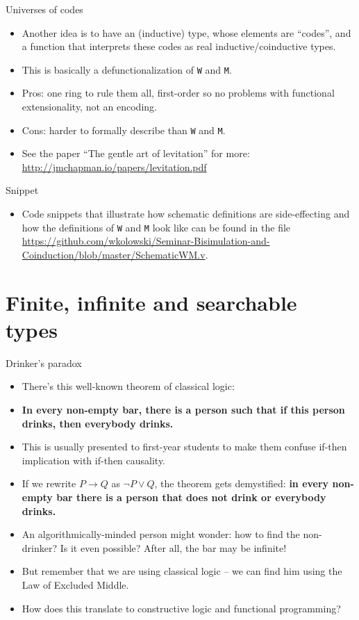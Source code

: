 \documentclass{beamer}
\begin{document}
\begin{frame}{Universes of codes}
\begin{itemize}
	\item Another idea is to have an (inductive) type, whose elements are ``codes'', and a function that interprets these codes as real inductive/coinductive types.
	\item This is basically a defunctionalization of \texttt{W} and \texttt{M}.
	\item Pros: one ring to rule them all, first-order so no problems with functional extensionality, not an encoding.
	\item Cons: harder to formally describe than \texttt{W} and \texttt{M}.
	\item See the paper ``The gentle art of levitation'' for more: \url{http://jmchapman.io/papers/levitation.pdf}
\end{itemize}
\end{frame}

\begin{frame}{Snippet}
\begin{itemize}
	\item Code snippets that illustrate how schematic definitions are side-effecting and how the definitions of \texttt{W} and \texttt{M} look like can be found in the file \url{https://github.com/wkolowski/Seminar-Bisimulation-and-Coinduction/blob/master/SchematicWM.v}.
\end{itemize}
\end{frame}

\section{Finite, infinite and searchable types}

\begin{frame}{Drinker's paradox}
\begin{itemize}
	\item There's this well-known theorem of classical logic:
	\item \textbf{In every non-empty bar, there is a person such that if this person drinks, then everybody drinks.}
	\item This is usually presented to first-year students to make them confuse if-then implication with if-then causality.
	\item If we rewrite $P \to Q$ as $\neg P \lor Q$, the theorem gets demystified: \textbf{in every non-empty bar there is a person that does not drink or everybody drinks.}
	\item An algorithmically-minded person might wonder: how to find the non-drinker? Is it even possible? After all, the bar may be infinite!
	\item But remember that we are using classical logic -- we can find him using the Law of Excluded Middle.
	\item How does this translate to constructive logic and functional programming?
\end{itemize}
\end{frame}
\end{document}
